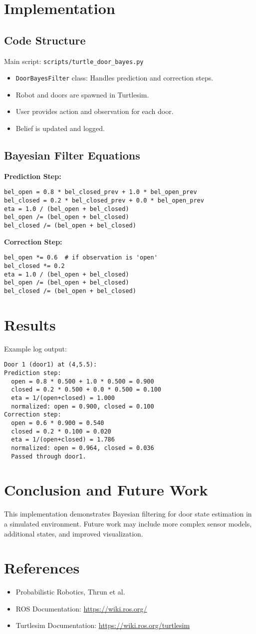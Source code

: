 \documentclass[12pt]{article}
\begin{document}
\section{Implementation}
\subsection{Code Structure}
Main script: \texttt{scripts/turtle_door_bayes.py}
\begin{itemize}
  \item \texttt{DoorBayesFilter} class: Handles prediction and correction steps.
  \item Robot and doors are spawned in Turtlesim.
  \item User provides action and observation for each door.
  \item Belief is updated and logged.
\end{itemize}
\subsection{Bayesian Filter Equations}
\textbf{Prediction Step:}
\begin{verbatim}
bel_open = 0.8 * bel_closed_prev + 1.0 * bel_open_prev
bel_closed = 0.2 * bel_closed_prev + 0.0 * bel_open_prev
eta = 1.0 / (bel_open + bel_closed)
bel_open /= (bel_open + bel_closed)
bel_closed /= (bel_open + bel_closed)
\end{verbatim}
\textbf{Correction Step:}
\begin{verbatim}
bel_open *= 0.6  # if observation is 'open'
bel_closed *= 0.2
eta = 1.0 / (bel_open + bel_closed)
bel_open /= (bel_open + bel_closed)
bel_closed /= (bel_open + bel_closed)
\end{verbatim}
\section{Results}
Example log output:
\begin{verbatim}
Door 1 (door1) at (4,5.5):
Prediction step:
  open = 0.8 * 0.500 + 1.0 * 0.500 = 0.900
  closed = 0.2 * 0.500 + 0.0 * 0.500 = 0.100
  eta = 1/(open+closed) = 1.000
  normalized: open = 0.900, closed = 0.100
Correction step:
  open = 0.6 * 0.900 = 0.540
  closed = 0.2 * 0.100 = 0.020
  eta = 1/(open+closed) = 1.786
  normalized: open = 0.964, closed = 0.036
  Passed through door1.
\end{verbatim}
\section{Conclusion and Future Work}
This implementation demonstrates Bayesian filtering for door state estimation in a simulated environment. Future work may include more complex sensor models, additional states, and improved visualization.
\section{References}
\begin{itemize}
  \item Probabilistic Robotics, Thrun et al.
  \item ROS Documentation: \url{https://wiki.ros.org/}
  \item Turtlesim Documentation: \url{https://wiki.ros.org/turtlesim}
\end{itemize}
\end{document}
